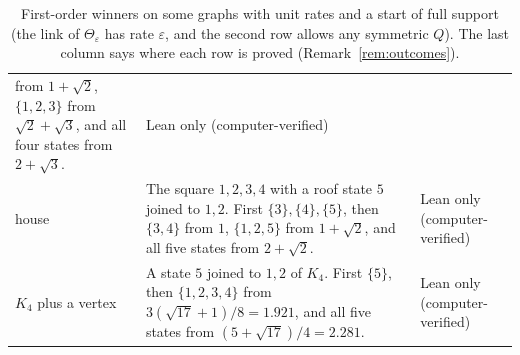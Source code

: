 \begin{table}[t]
\begin{tabular}{@{}>{\raggedright\arraybackslash}p{1.8cm}
>{\raggedright\arraybackslash}p{8.9cm}
>{\raggedright\arraybackslash}p{2.4cm}@{}}
from $1+\sqrt2$, $\{1,2,3\}$ from $\sqrt2+\sqrt3$, and all four states from
$2+\sqrt3$. & Lean only (computer-verified)\\
house & The square $1,2,3,4$ with a roof state $5$ joined to $1,2$.
First $\{3\},\{4\},\{5\}$, then $\{3,4\}$ from $1$, $\{1,2,5\}$ from $1+\sqrt2$, and
all five states from $2+\sqrt2$. & Lean only (computer-verified)\\
$K_4$ plus a vertex & A state $5$ joined to $1,2$ of $K_4$. First $\{5\}$, then
$\{1,2,3,4\}$ from $3(\sqrt{17}+1)/8=1.921$, and all five states from
$(5+\sqrt{17})/4=2.281$. & Lean only (computer-verified)\\
\bottomrule
\end{tabular}
\caption{First-order winners on some graphs with unit rates and a start of full
support (the link of $\Theta_\varepsilon$ has rate $\varepsilon$, and the second
row allows any symmetric $Q$). The last column says where
each row is proved (Remark~\ref{rem:outcomes}).}
\label{tab:outcomes}
\end{table}

